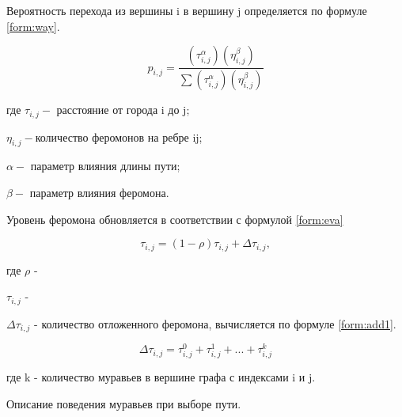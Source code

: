 Вероятность перехода из вершины i в вершину j определяется по формуле \ref{form:way}.

\begin{equation}\label{form:way}
	p_{i,j}={\frac {(\tau_{i,j}^{\alpha })(\eta_{i,j}^{\beta })}{\sum (\tau_{i,j}^{\alpha })(\eta_{i,j}^{\beta })}}
\end{equation}

где $ \tau_{i,j} - $ расстояние от города i до j;

$\eta_{i,j} - $количество феромонов на ребре ij;

$\alpha - $ параметр влияния длины пути;

$\beta - $ параметр влияния феромона.

Уровень феромона обновляется в соответствии с формулой \ref{form:eva}


\begin{equation}\label{form:eva}
	\tau_{i,j}=(1-\rho )\tau_{i,j}+\Delta \tau_{i,j},
\end{equation}

где $\rho$ - 

$\tau_{i,j}$ - 

$\Delta \tau_{i,j}$ - количество отложенного феромона, вычисляется по формуле \ref{form:add1}.

\begin{equation}\label{form:add1}
	\Delta \tau_{i,j}= \tau_{i,j}^0 + \tau_{i,j}^1 + ... + \tau_{i,j}^k
\end{equation}

где k - количество муравьев в вершине графа с индексами i и j.


Описание поведения муравьев при выборе пути.


